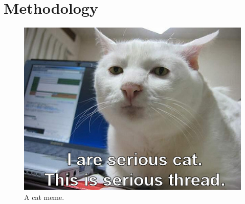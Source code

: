 \chapter{Methodology}

\begin{figure}[H]
    \centering
    \includegraphics[width=1\linewidth]{figures/cat_meme.jpeg}
    \caption{A cat meme.}
    \label{fig:overall_framework}
\end{figure}